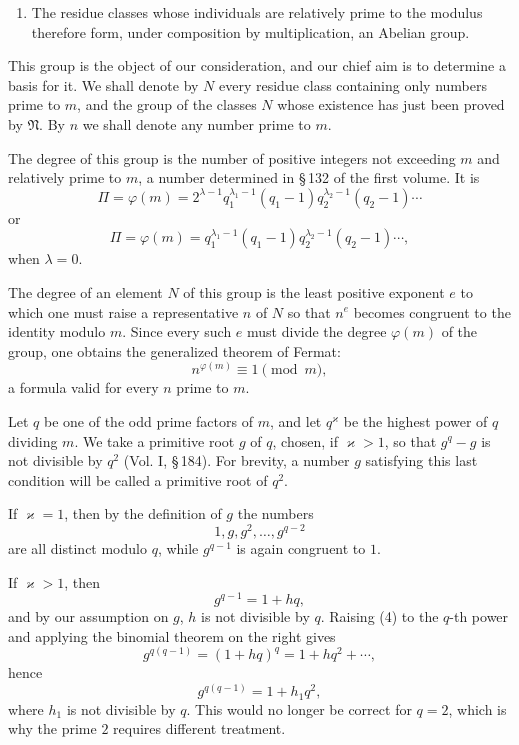 \documentclass[11pt]{article}
\begin{document}
\begin{enumerate}[label=\arabic*.]
\item The residue classes whose individuals are relatively prime to the modulus therefore form, under composition by multiplication, an Abelian group.
\end{enumerate}

This group is the object of our consideration, and our chief aim is to determine a basis for it. We shall denote by $N$ every residue class containing only numbers prime to $m$, and the group of the classes $N$ whose existence has just been proved by $\mathfrak N$. By $n$ we shall denote any number prime to $m$.

The degree of this group is the number of positive integers not exceeding $m$ and relatively prime to $m$, a number determined in \S\,132 of the first volume. It is
\begin{equation}
\Pi=\varphi(m)=2^{\lambda-1}q_1^{\lambda_1-1}(q_1-1)q_2^{\lambda_2-1}(q_2-1)\cdots
\tag{2}
\end{equation}
or
\[
\Pi=\varphi(m)=q_1^{\lambda_1-1}(q_1-1)q_2^{\lambda_2-1}(q_2-1)\cdots,
\]
when $\lambda=0$.

The degree of an element $N$ of this group is the least positive exponent $e$ to which one must raise a representative $n$ of $N$ so that $n^e$ becomes congruent to the identity modulo $m$. Since every such $e$ must divide the degree $\varphi(m)$ of the group, one obtains the generalized theorem of Fermat:
\begin{equation}
n^{\varphi(m)}\equiv1\pmod m,
\tag{3}
\end{equation}
a formula valid for every $n$ prime to $m$.

Let $q$ be one of the odd prime factors of $m$, and let $q^\varkappa$ be the highest power of $q$ dividing $m$. We take a primitive root $g$ of $q$, chosen, if $\varkappa>1$, so that $g^q-g$ is not divisible by $q^2$ (Vol. I, \S\,184). For brevity, a number $g$ satisfying this last condition will be called a primitive root of $q^2$.

If $\varkappa=1$, then by the definition of $g$ the numbers
\[
1,g,g^2,
\ldots,g^{q-2}
\]
are all distinct modulo $q$, while $g^{q-1}$ is again congruent to $1$.

If $\varkappa>1$, then
\begin{equation}
g^{q-1}=1+hq,
\tag{4}
\end{equation}
and by our assumption on $g$, $h$ is not divisible by $q$. Raising (4) to the $q$-th power and applying the binomial theorem on the right gives
\[
g^{q(q-1)}=(1+hq)^q=1+hq^2+\cdots,
\]
hence
\begin{equation}
g^{q(q-1)}=1+h_1q^2,
\tag{5}
\end{equation}
where $h_1$ is not divisible by $q$. This would no longer be correct for $q=2$, which is why the prime $2$ requires different treatment.
\end{document}
